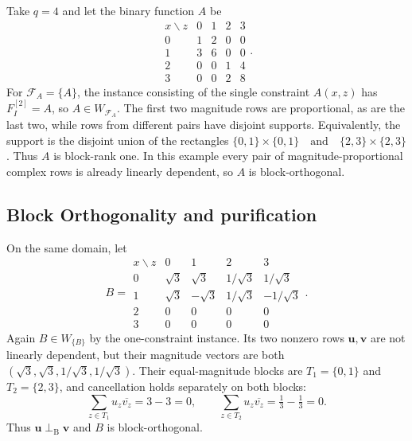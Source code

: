 \documentclass[11pt,letterpaper,onecolumn]{article}
\theoremstyle{plain}
\theoremstyle{definition}
\theoremstyle{remark}
\newcommand{\cF}{\mathcal F}
\begin{document}
Take $q=4$ and let the binary function $A$ be
\[
\begin{array}{c|rrrr}
  x\backslash z&0&1&2&3\\ \hline
  0&1&2&0&0\\
  1&3&6&0&0\\
  2&0&0&1&4\\
  3&0&0&2&8
\end{array}.
\]
For $\cF_A=\{A\}$, the instance consisting of the single
constraint $A(x,z)$ has $F_I^{[2]}=A$, so $A\in W_{\cF_A}$.  The first two
magnitude rows are proportional, as are the last two, while rows from
different pairs have disjoint supports.  Equivalently, the support is the
disjoint union of the rectangles $\{0,1\}\times\{0,1\} \quad\text{and}\quad \{2,3\}\times\{2,3\}$. Thus $A$ is block-rank one.  In this example every pair of
magnitude-proportional complex rows is already linearly dependent, so $A$ is block-orthogonal.

\subsection{Block Orthogonality and purification}
\label{app:block-orthogonality-example}

On the same domain, let
\[
B=
\begin{array}{c|rrrr}
  x\backslash z&0&1&2&3\\ \hline
  0&\sqrt3&\sqrt3&1/\sqrt3&1/\sqrt3\\
  1&\sqrt3&-\sqrt3&1/\sqrt3&-1/\sqrt3\\
  2&0&0&0&0\\
  3&0&0&0&0
\end{array}.
\]
Again $B\in W_{\{B\}}$ by the one-constraint instance.  Its two nonzero
rows $\mathbf u,\mathbf v$ are not linearly dependent, but their magnitude
vectors are both $(\sqrt3,\sqrt3,1/\sqrt3,1/\sqrt3)$.
Their equal-magnitude blocks are $T_1=\{0,1\}$ and $T_2=\{2,3\}$, and
cancellation holds separately on both blocks:
\[
  \sum_{z\in T_1}u_z\overline{v_z}=3-3=0,
  \qquad
  \sum_{z\in T_2}u_z\overline{v_z}=\tfrac13-\tfrac13=0.
\]
Thus $\mathbf u\perp_{\mathrm B}\mathbf v$ and $B$ is block-orthogonal.
\end{document}

